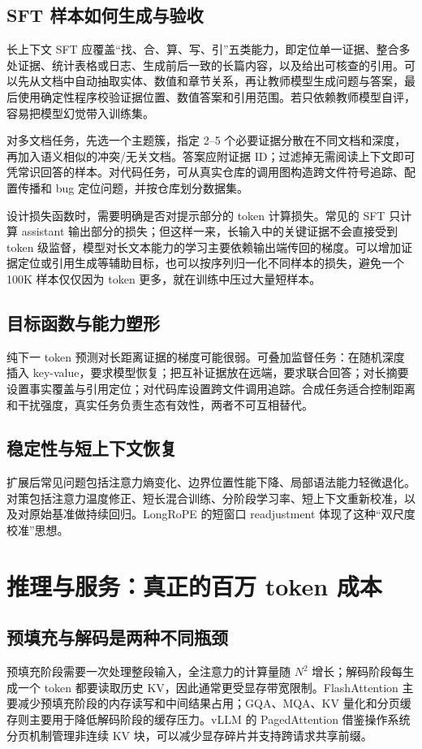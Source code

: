 \documentclass[UTF8,10pt,a4paper,fontset=none]{ctexart}
\begin{document}
\subsection{SFT 样本如何生成与验收}
长上下文 SFT 应覆盖“找、合、算、写、引”五类能力，即定位单一证据、整合多处证据、统计表格或日志、生成前后一致的长篇内容，以及给出可核查的引用。可以先从文档中自动抽取实体、数值和章节关系，再让教师模型生成问题与答案，最后使用确定性程序校验证据位置、数值答案和引用范围。若只依赖教师模型自评，容易把模型幻觉带入训练集。

对多文档任务，先选一个主题簇，指定 2--5 个必要证据分散在不同文档和深度，再加入语义相似的冲突/无关文档。答案应附证据 ID；过滤掉无需阅读上下文即可凭常识回答的样本。对代码任务，可从真实仓库的调用图构造跨文件符号追踪、配置传播和 bug 定位问题，并按仓库划分数据集。

设计损失函数时，需要明确是否对提示部分的 token 计算损失。常见的 SFT 只计算 assistant 输出部分的损失；但这样一来，长输入中的关键证据不会直接受到 token 级监督，模型对长文本能力的学习主要依赖输出端传回的梯度。可以增加证据定位或引用生成等辅助目标，也可以按序列归一化不同样本的损失，避免一个 100K 样本仅仅因为 token 更多，就在训练中压过大量短样本。

\subsection{目标函数与能力塑形}
纯下一 token 预测对长距离证据的梯度可能很弱。可叠加监督任务：在随机深度插入 key-value，要求模型恢复；把互补证据放在远端，要求联合回答；对长摘要设置事实覆盖与引用定位；对代码库设置跨文件调用追踪。合成任务适合控制距离和干扰强度，真实任务负责生态有效性，两者不可互相替代。

\subsection{稳定性与短上下文恢复}
扩展后常见问题包括注意力熵变化、边界位置性能下降、局部语法能力轻微退化。对策包括注意力温度修正、短长混合训练、分阶段学习率、短上下文重新校准，以及对原始基准做持续回归。LongRoPE 的短窗口 readjustment 体现了这种“双尺度校准”思想\cite{ding2024longrope}。

\section{推理与服务：真正的百万 token 成本}
\subsection{预填充与解码是两种不同瓶颈}
预填充阶段需要一次处理整段输入，全注意力的计算量随 $N^2$ 增长；解码阶段每生成一个 token 都要读取历史 KV，因此通常更受显存带宽限制。FlashAttention 主要减少预填充阶段的内存读写和中间结果占用；GQA、MQA、KV 量化和分页缓存则主要用于降低解码阶段的缓存压力。vLLM 的 PagedAttention 借鉴操作系统分页机制管理非连续 KV 块，可以减少显存碎片并支持跨请求共享前缀\cite{kwon2023pagedattention}。
\end{document}
